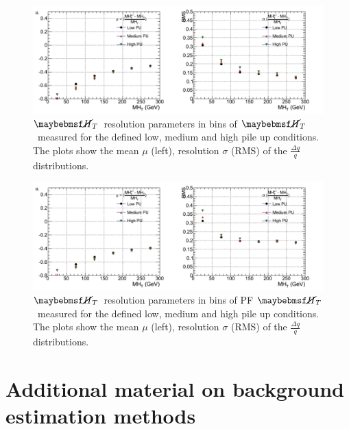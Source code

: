 \begin{figure}[h!]
  \vspace{20pt}
        \centering
        \includegraphics[width=1.0\textwidth]{plots/res_CaloMHT_summary.pdf}
        \caption[$\mht$~resolution parameters in bins of $\mht$~measured for the defined low, medium and high pile up conditions.]{$\mht$~resolution parameters in bins of $\mht$~measured for the defined low, medium and high pile up conditions. The plots show the mean $\mu$ (left), resolution $\sigma$ (RMS) of the $\frac{\Delta q}{q}$ distributions.}
        \label{fig:calomhtresultspu}
\end{figure}
\begin{figure}[h!]
  \vspace{20pt}
        \centering
        \includegraphics[width=1.0\textwidth]{plots/res_pfMHT_summary.pdf}
        \caption[$\mht$~resolution parameters in bins of PF $\mht$~measured for the defined low, medium and high pile up conditions.]{$\mht$~resolution parameters in bins of PF $\mht$~measured for the defined low, medium and high pile up conditions. The plots show the mean $\mu$ (left), resolution $\sigma$ (RMS) of the $\frac{\Delta q}{q}$ distributions.}
        \label{fig:pfmhtresultspu}
\end{figure}

\chapter{Additional material on background estimation methods}
\label{app:backgroundestimation}
